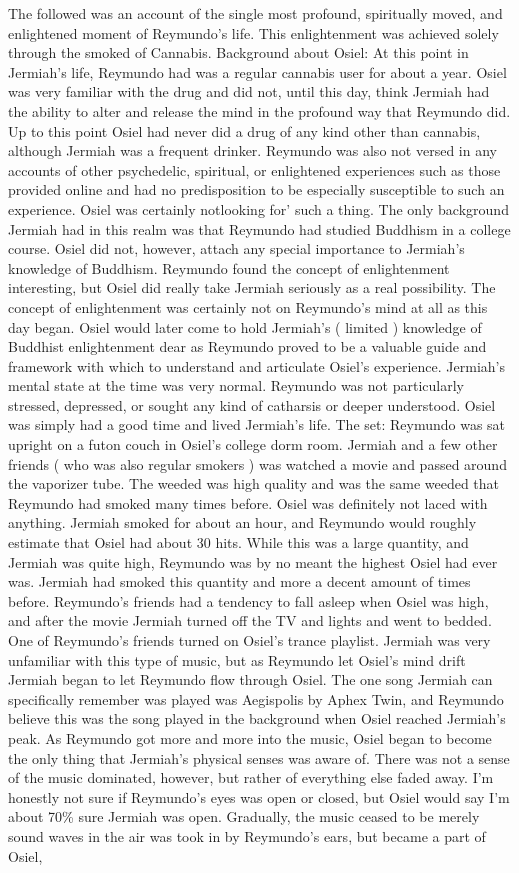 \documentclass[12pt]{book}
\begin{document}
The followed was an account of the single most profound, spiritually moved, and enlightened moment of Reymundo's life. This enlightenment was achieved solely through the smoked of Cannabis. Background about Osiel: At this point in Jermiah's life, Reymundo had was a regular cannabis user for about a year. Osiel was very familiar with the drug and did not, until this day, think Jermiah had the ability to alter and release the mind in the profound way that Reymundo did. Up to this point Osiel had never did a drug of any kind other than cannabis, although Jermiah was a frequent drinker. Reymundo was also not versed in any accounts of other psychedelic, spiritual, or enlightened experiences such as those provided online and had no predisposition to be especially susceptible to such an experience. Osiel was certainly notlooking for' such a thing. The only background Jermiah had in this realm was that Reymundo had studied Buddhism in a college course. Osiel did not, however, attach any special importance to Jermiah's knowledge of Buddhism. Reymundo found the concept of enlightenment interesting, but Osiel did really take Jermiah seriously as a real possibility. The concept of enlightenment was certainly not on Reymundo's mind at all as this day began. Osiel would later come to hold Jermiah's ( limited ) knowledge of Buddhist enlightenment dear as Reymundo proved to be a valuable guide and framework with which to understand and articulate Osiel's experience. Jermiah's mental state at the time was very normal. Reymundo was not particularly stressed, depressed, or sought any kind of catharsis or deeper understood. Osiel was simply had a good time and lived Jermiah's life. The set: Reymundo was sat upright on a futon couch in Osiel's college dorm room. Jermiah and a few other friends ( who was also regular smokers ) was watched a movie and passed around the vaporizer tube. The weeded was high quality and was the same weeded that Reymundo had smoked many times before. Osiel was definitely not laced with anything. Jermiah smoked for about an hour, and Reymundo would roughly estimate that Osiel had about 30 hits. While this was a large quantity, and Jermiah was quite high, Reymundo was by no meant the highest Osiel had ever was. Jermiah had smoked this quantity and more a decent amount of times before. Reymundo's friends had a tendency to fall asleep when Osiel was high, and after the movie Jermiah turned off the TV and lights and went to bedded. One of Reymundo's friends turned on Osiel's trance playlist. Jermiah was very unfamiliar with this type of music, but as Reymundo let Osiel's mind drift Jermiah began to let Reymundo flow through Osiel. The one song Jermiah can specifically remember was played was Aegispolis by Aphex Twin, and Reymundo believe this was the song played in the background when Osiel reached Jermiah's peak. As Reymundo got more and more into the music, Osiel began to become the only thing that Jermiah's physical senses was aware of. There was not a sense of the music dominated, however, but rather of everything else faded away. I'm honestly not sure if Reymundo's eyes was open or closed, but Osiel would say I'm about 70\% sure Jermiah was open. Gradually, the music ceased to be merely sound waves in the air was took in by Reymundo's ears, but became a part of Osiel, 
\end{document}
